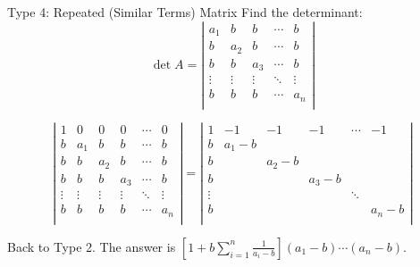 \documentclass{beamer}
\begin{document}
\begin{frame}{Type 4: Repeated (Similar Terms) Matrix}
Find the determinant:
\begin{equation*}
    \det A=\left| \begin{matrix}
        a_1&		b&		b&		\cdots&		b\\
        b&		a_2&		b&		\cdots&		b\\
        b&		b&		a_3&		\cdots&		b\\
        \vdots&		\vdots&		\vdots&		\ddots&		\vdots\\
        b&		b&		b&		\cdots&		a_n\\
    \end{matrix} \right|
\end{equation*}

\begin{equation*}
    \left| \begin{matrix}
        1&		0&		0&		0&		\cdots&		0\\
        b&		a_1&		b&		b&		\cdots&		b\\
        b&		b&		a_2&		b&		\cdots&		b\\
        b&		b&		b&		a_3&		\cdots&		b\\
        \vdots&		\vdots&		\vdots&		\vdots&		\ddots&		\vdots\\
        b&		b&		b&		b&		\cdots&		a_n\\
    \end{matrix} \right|=\left| \begin{matrix}
        1&		-1&		-1&		-1&		\cdots&		-1\\
        b&		a_1-b&		&		&		&		\\
        b&		&		a_2-b&		&		&		\\
        b&		&		&		a_3-b&		&		\\
        \vdots&		&		&		&		\ddots&		\\
        b&		&		&		&		&		a_n-b\\
    \end{matrix} \right|
\end{equation*}

Back to Type 2. The answer is $\left[ 1+b\sum_{i=1}^n{\frac{1}{a_i-b}} \right] \left( a_1-b \right)  \cdots \left( a_n-b \right)$.
\end{frame}
\end{document}

